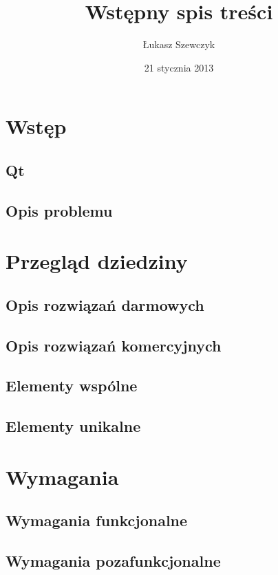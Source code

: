 \documentclass[11pt,twoside,a4paper,final]{llncs}
\begin{document}
\date{21 stycznia 2013}
\title{Wstępny spis treści}

\author{Łukasz Szewczyk}

\maketitle

\section{Wstęp}
\subsection{Qt}
\subsection{Opis problemu}


\section{Przegląd dziedziny}
\subsection{Opis rozwiązań darmowych}
\subsection{Opis rozwiązań komercyjnych}
\subsection{Elementy wspólne}
\subsection{Elementy unikalne\newline}

\section{Wymagania}
\subsection{Wymagania funkcjonalne}
\subsection{Wymagania pozafunkcjonalne\newline}
\end{document}
